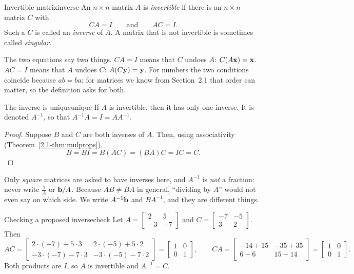 \documentclass[11pt]{article}
\begin{document}
\begin{defn}{Invertible matrix}{inverse}
An $n\times n$ matrix $A$ is \emph{invertible} if there is an $n\times n$ matrix $C$ with
\[
CA=I\qquad\text{and}\qquad AC=I .
\]
Such a $C$ is called an \emph{inverse} of $A$. A matrix that is not invertible is sometimes called \emph{singular}.
\end{defn}

The two equations say two things. $CA=I$ means that $C$ undoes $A$: $C(A\mathbf{x})=\mathbf{x}$. $AC=I$ means that $A$ undoes $C$: $A(C\mathbf{y})=\mathbf{y}$. For numbers the two conditions coincide because $ab=ba$; for matrices we know from Section~2.1 that order can matter, so the definition asks for both.

\begin{thm}{The inverse is unique}{unique}
If $A$ is invertible, then it has only one inverse. It is denoted $A^{-1}$, so that $A^{-1}A=I=AA^{-1}$.
\end{thm}

\begin{proof}
Suppose $B$ and $C$ are both inverses of $A$. Then, using associativity (Theorem~\ref{2.1-thm:mulprops}),
\[
B=BI=B(AC)=(BA)C=IC=C.
\]
\end{proof}

\begin{warn}
Only \emph{square} matrices are asked to have inverses here, and $A^{-1}$ is \emph{not} a fraction: never write $\tfrac1A$ or $\mathbf{b}/A$. Because $AB\neq BA$ in general, ``dividing by $A$'' would not even say on which side. We write $A^{-1}\mathbf{b}$ and $BA^{-1}$, and they are different things.
\end{warn}

\begin{exmp}{Checking a proposed inverse}{check}
Let $A=\begin{bmatrix}2&5\\-3&-7\end{bmatrix}$ and $C=\begin{bmatrix}-7&-5\\3&2\end{bmatrix}$. Then
\[
AC=\begin{bmatrix}2\cdot(-7)+5\cdot3&2\cdot(-5)+5\cdot2\\-3\cdot(-7)-7\cdot3&-3\cdot(-5)-7\cdot2\end{bmatrix}=\begin{bmatrix}1&0\\0&1\end{bmatrix},\qquad
CA=\begin{bmatrix}-14+15&-35+35\\6-6&15-14\end{bmatrix}=\begin{bmatrix}1&0\\0&1\end{bmatrix}.
\]
Both products are $I$, so $A$ is invertible and $A^{-1}=C$.
\end{exmp}
\end{document}
